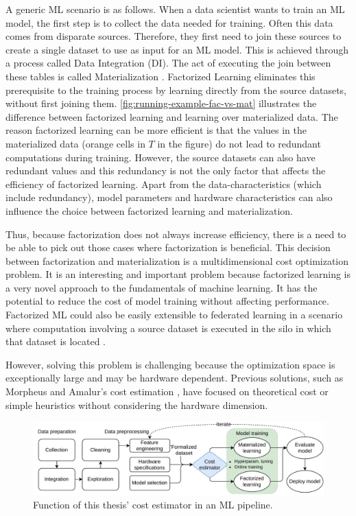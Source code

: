 A generic ML scenario is as follows. When a data scientist wants to train an ML model, the first step is to collect the data needed for training. Often this data comes from disparate sources. Therefore, they first need to join these sources to create a single dataset to use as input for an ML model. This is achieved through a process called Data Integration (DI). The act of executing the join between these tables is called Materialization \cite{rel_db_glossary}. Factorized Learning eliminates this prerequisite to the training process by learning directly from the source datasets, without first joining them. \autoref{fig:running-example-fac-vs-mat} illustrates the difference between factorized learning and learning over materialized data. The reason factorized learning can be more efficient is that the values in the materialized data (orange cells in $T$ in the figure) do not lead to redundant computations during training. However, the source datasets can also have redundant values and this redundancy is not the only factor that affects the efficiency of factorized learning. Apart from the data-characteristics (which include redundancy), model parameters and hardware characteristics can also influence the choice between factorized learning and materialization.

Thus, because factorization does not always increase efficiency, there is a need to be able to pick out those cases where factorization is beneficial. This decision between factorization and materialization is a multidimensional cost optimization problem. It is an interesting and important problem because factorized learning is a very novel approach to the fundamentals of machine learning. It has the potential to reduce the cost of model training without affecting performance. Factorized ML could also be easily extensible to federated learning in a scenario where computation involving a source dataset is executed in the silo in which that dataset is located \cite{amalur}.

However, solving this problem is challenging because the optimization space is exceptionally large and may be hardware dependent. Previous solutions, such as Morpheus \cite{morpheus} and Amalur's cost estimation \cite{schijndel_cost_estimation}, have focused on theoretical cost or simple heuristics without considering the hardware dimension.

\begin{figure}[h]
    \centering
    \includegraphics[width=0.95\linewidth]{chapters/01_introduction/figures/ML-Pipeline.pdf}
    \caption{Function of this thesis' cost estimator in an ML pipeline.}
    \label{fig:ml-pipeline}
\end{figure}

